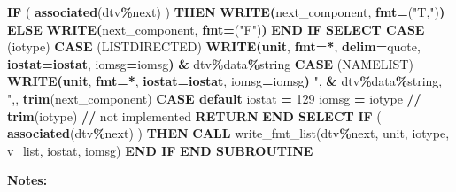 \documentclass[
  paper=a4,
  ,captions=tableheading
]{scrartcl}
\newenvironment{Shaded}{\begin{snugshade}}{\end{snugshade}}
\newcommand{\DecValTok}[1]{\textcolor[rgb]{0.00,0.00,0.81}{#1}}
\newcommand{\FunctionTok}[1]{\textcolor[rgb]{0.13,0.29,0.53}{\textbf{#1}}}
\newcommand{\KeywordTok}[1]{\textcolor[rgb]{0.13,0.29,0.53}{\textbf{#1}}}
\newcommand{\NormalTok}[1]{#1}
\newcommand{\OperatorTok}[1]{\textcolor[rgb]{0.81,0.36,0.00}{\textbf{#1}}}
\newcommand{\StringTok}[1]{\textcolor[rgb]{0.31,0.60,0.02}{#1}}
\begin{document}
\begin{Shaded}
\begin{Highlighting}[]
   \KeywordTok{IF}\NormalTok{ ( }\FunctionTok{associated}\NormalTok{(dtv}\OperatorTok{\%}\NormalTok{next) ) }\KeywordTok{THEN}
      \FunctionTok{WRITE(}\NormalTok{next\_component, }\FunctionTok{fmt}\KeywordTok{=}\StringTok{\textquotesingle{}("T,")\textquotesingle{}}\FunctionTok{)}
   \KeywordTok{ELSE}
      \FunctionTok{WRITE(}\NormalTok{next\_component, }\FunctionTok{fmt}\KeywordTok{=}\StringTok{\textquotesingle{}("F")\textquotesingle{}}\FunctionTok{)}
   \KeywordTok{END IF}
   \KeywordTok{SELECT CASE}\NormalTok{ (iotype)}
   \KeywordTok{CASE}\NormalTok{ (}\StringTok{\textquotesingle{}LISTDIRECTED\textquotesingle{}}\NormalTok{)}
      \FunctionTok{WRITE(unit}\NormalTok{, }\FunctionTok{fmt}\KeywordTok{=}\FunctionTok{*}\NormalTok{, }\FunctionTok{delim}\KeywordTok{=}\StringTok{\textquotesingle{}quote\textquotesingle{}}\NormalTok{, }\FunctionTok{iostat}\KeywordTok{=}\FunctionTok{iostat}\NormalTok{, iomsg}\KeywordTok{=}\NormalTok{iomsg}\FunctionTok{)} \KeywordTok{\&}
\NormalTok{            dtv}\OperatorTok{\%}\NormalTok{data}\OperatorTok{\%}\NormalTok{string}
   \KeywordTok{CASE}\NormalTok{ (}\StringTok{\textquotesingle{}NAMELIST\textquotesingle{}}\NormalTok{)}
      \FunctionTok{WRITE(unit}\NormalTok{, }\FunctionTok{fmt}\KeywordTok{=}\FunctionTok{*}\NormalTok{, }\FunctionTok{iostat}\KeywordTok{=}\FunctionTok{iostat}\NormalTok{, iomsg}\KeywordTok{=}\NormalTok{iomsg}\FunctionTok{)} \StringTok{\textquotesingle{}"\textquotesingle{}}\NormalTok{, }\KeywordTok{\&}
\NormalTok{            dtv}\OperatorTok{\%}\NormalTok{data}\OperatorTok{\%}\NormalTok{string, }\StringTok{\textquotesingle{}",\textquotesingle{}}\NormalTok{, }\FunctionTok{trim}\NormalTok{(next\_component)}
   \KeywordTok{CASE default}
\NormalTok{      iostat }\KeywordTok{=} \DecValTok{129}
\NormalTok{      iomsg }\KeywordTok{=} \StringTok{\textquotesingle{}iotype \textquotesingle{}} \KeywordTok{//} \FunctionTok{trim}\NormalTok{(iotype) }\KeywordTok{//} \StringTok{\textquotesingle{} not implemented\textquotesingle{}}
      \KeywordTok{RETURN}
   \KeywordTok{END SELECT}
   \KeywordTok{IF}\NormalTok{ ( }\FunctionTok{associated}\NormalTok{(dtv}\OperatorTok{\%}\NormalTok{next) ) }\KeywordTok{THEN}
      \KeywordTok{CALL}\NormalTok{ write\_fmt\_list(dtv}\OperatorTok{\%}\NormalTok{next, unit, iotype, v\_list, iostat, iomsg)}
   \KeywordTok{END IF}
\KeywordTok{END SUBROUTINE}
\end{Highlighting}
\end{Shaded}

\textbf{Notes:}
\end{document}

